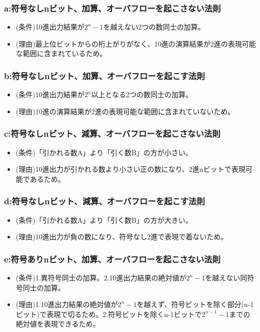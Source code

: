 \documentclass[11pt,a4j]{jsarticle}
\begin{document}
    \subsubsection{a:符号なしnビット、加算、オーバフローを起こさない法則}
     \begin{itemize}
     \item (条件)10進出力結果が$2^n-1$を越えない2つの数同士の加算。
     \item (理由)最上位ビットからの桁上がりがなく、10進の演算結果が2進の表現可能な範囲に含まれているため。
     \end{itemize}
     
    \subsubsection{b:符号なしnビット、加算、オーバフローを起こす法則}
     \begin{itemize}
     \item (条件)10進出力結果が$2^n$以上となる2つの数同士の加算。
     \item (理由)10進の演算結果が2進の表現可能な範囲に含まれていないため。
     \end{itemize}
     
    \subsubsection{c:符号なしnビット、減算、オーバフローを起こさない法則}
    \begin{itemize}
     \item (条件)「引かれる数A」より「引く数B」の方が小さい。
     \item (理由)10進出力が引かれる数より小さい正の数になり、2進nビットで表現可能であるため。
     \end{itemize}
    
    \subsubsection{d:符号なしnビット、減算、オーバフローを起こす法則}
    \begin{itemize}
     \item (条件)「引かれる数A」より「引く数B」の方が大きい。
     \item (理由)10進出力が負の数になり、符号なし2進で表現で着ないため。
     \end{itemize}
    
    \subsubsection{e:符号ありnビット、加算、オーバフローを起こさない法則}
    \begin{itemize}
     \item (条件)1.異符号同士の加算。2.10進出力結果の絶対値が$2^n-1$を越えない同符号同士の加算。
     \item (理由)1.10進出力結果の絶対値が$2^n-1$を越えず、符号ビットを除く部分(n-1ビット)で表現で切るため。2.符号ビットを除くn-1ビットで$2^{n-1}-1$までの絶対値を表現できるため。
     \end{itemize}
    
\end{document}

